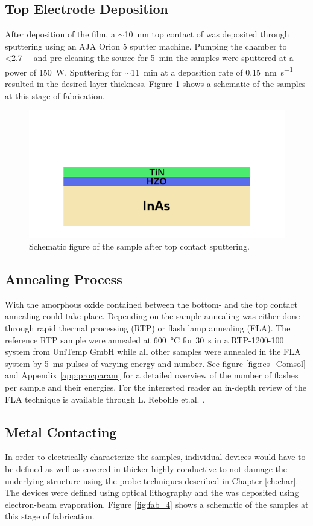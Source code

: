 \documentclass[11pt,twoside]{eitExjobb}
\begin{document}
\subsection{Top Electrode Deposition}
After deposition of the  film, a $\sim$\SI{10}{\nano\meter} top
contact of  was deposited through sputtering using an AJA Orion 5
sputter machine. Pumping the chamber to <\SI{2.7}{\milli\torr} and pre-cleaning
the source for \SI{5}{\minute} the samples were sputtered at a power of
\SI{150}{\watt}. Sputtering for $\sim$\SI{11}{\minute} at a deposition rate of
\SI{0.15}{\nano\meter\per\second} resulted in the desired layer thickness.
Figure \ref{fig:fab_3} shows a schematic of the samples at this stage of
fabrication.

\begin{figure}[htbp]
    \centering
    \includegraphics[width=.45\linewidth]{fig/fabproc/fab_3.png}
    \caption{Schematic figure of the sample after top contact
    sputtering.}\label{fig:fab_3}
\end{figure}

\subsection{Annealing Process}
With the amorphous oxide contained between the bottom- and the top contact annealing
could take place. Depending on the sample annealing was either done through
rapid thermal processing (RTP) or flash lamp annealing (FLA). The reference RTP
sample were annealed at \SI{600}{\celsius} for \SI{30}{\second} in a
RTP-1200-100 system from UniTemp GmbH while all other samples were annealed in
the FLA system by \SI{5}{\milli\second} pulses of varying energy and number.
See figure \ref{fig:res_Comsol} and Appendix \ref{app:procparam} for a detailed
overview of the number of flashes per sample and their energies. For the
interested reader an in-depth review of the FLA technique is available through
L. Rebohle et.al. \cite{rebohle2016review}.

\subsection{Metal Contacting}
In order to electrically characterize the samples, individual devices would
have to be defined as well as covered in thicker highly conductive  to
not damage the underlying structure using the probe techniques described in
Chapter \ref{ch:char}. The devices were defined using optical lithography and
the  was deposited using electron-beam evaporation. Figure
\ref{fig:fab_4} shows a schematic of the samples at this stage of fabrication.
\end{document}
